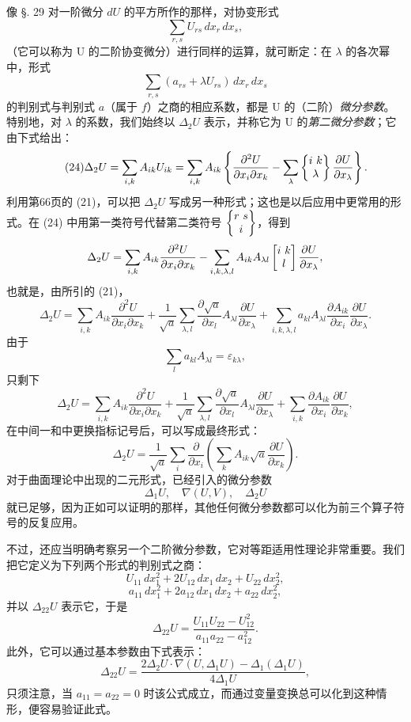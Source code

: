 像 §. 29 对一阶微分 \(dU\) 的平方所作的那样，对协变形式
\[
\sum_{r,s}U_{rs}\,dx_r\,dx_s,
\]
（它可以称为 U 的二阶协变微分）进行同样的运算，就可断定：在 \(\lambda\) 的各次幂中，形式
\[
\sum_{r,s}(a_{rs}+\lambda U_{rs})\,dx_r\,dx_s
\]
的判别式与判别式 \(a\)（属于 \(f\)）之商的相应系数，都是 U 的（二阶）\emph{微分参数}。特别地，对 \(\lambda\) 的系数，我们始终以 \(\Delta_2U\) 表示，并称它为 U 的\emph{第二微分参数}；它由下式给出：
\begin{equation}\tag{24}
\Delta_2U=\sum_{i,k}A_{ik}U_{ik}=\sum_{i,k}A_{ik}\left\{\frac{\partial^2U}{\partial x_i\partial x_k}-\sum_\lambda\left\{\begin{matrix}i\ k\\ \lambda\end{matrix}\right\}\frac{\partial U}{\partial x_\lambda}\right\}.
\end{equation}
利用第66页的 (21)，可以把 \(\Delta_2U\) 写成另一种形式；这也是以后应用中更常用的形式。在 (24) 中用第一类符号代替第二类符号 \(\left\{\begin{matrix}r\ s\\ i\end{matrix}\right\}\)，得到
\[
\Delta_2U=\sum_{i,k}A_{ik}\frac{\partial^2U}{\partial x_i\partial x_k}-\sum_{i,k,\lambda,l}A_{ik}A_{\lambda l}\left[\begin{matrix}i\ k\\ l\end{matrix}\right]\frac{\partial U}{\partial x_\lambda},
\]
也就是，由所引的 (21)，
\[
\Delta_2U=\sum_{i,k}A_{ik}\frac{\partial^2U}{\partial x_i\partial x_k}
+\frac{1}{\sqrt{a}}\sum_{\lambda,l}\frac{\partial\sqrt{a}}{\partial x_l}A_{\lambda l}\frac{\partial U}{\partial x_\lambda}
+\sum_{i,k,\lambda,l}a_{kl}A_{\lambda l}\frac{\partial A_{ik}}{\partial x_i}\frac{\partial U}{\partial x_\lambda}.
\]
由于
\[
\sum_l a_{kl}A_{\lambda l}=\varepsilon_{k\lambda},
\]
只剩下
\[
\Delta_2U=\sum_{i,k}A_{ik}\frac{\partial^2U}{\partial x_i\partial x_k}
+\frac{1}{\sqrt{a}}\sum_{\lambda,l}\frac{\partial\sqrt{a}}{\partial x_l}A_{\lambda l}\frac{\partial U}{\partial x_\lambda}
+\sum_{i,k}\frac{\partial A_{ik}}{\partial x_i}\frac{\partial U}{\partial x_k},
\]
在中间一和中更换指标记号后，可以写成最终形式：
\begin{equation}\tag{25}
\Delta_2U=\frac{1}{\sqrt{a}}\sum_i\frac{\partial}{\partial x_i}\left(\sum_k A_{ik}\sqrt{a}\frac{\partial U}{\partial x_k}\right).
\end{equation}
对于曲面理论中出现的二元形式，已经引入的微分参数
\[
\Delta_1U,\quad \nabla(U,V),\quad \Delta_2U
\]
就已足够，因为正如可以证明的那样，其他任何微分参数都可以化为前三个算子符号的反复应用。

不过，还应当明确考察另一个二阶微分参数，它对等距适用性理论非常重要。我们把它定义为下列两个形式的判别式之商：
\[
U_{11}\,dx_1^2+2U_{12}\,dx_1\,dx_2+U_{22}\,dx_2^2,
\]
\[
a_{11}\,dx_1^2+2a_{12}\,dx_1\,dx_2+a_{22}\,dx_2^2,
\]
并以 \(\Delta_{22}U\) 表示它，于是
\begin{equation}\tag{26}
\Delta_{22}U=\frac{U_{11}U_{22}-U_{12}^2}{a_{11}a_{22}-a_{12}^2}.
\end{equation}
此外，它可以通过基本参数由下式表示：
\begin{equation}\tag{26*}
\Delta_{22}U=\frac{2\Delta_2U\cdot\nabla(U,\Delta_1U)-\Delta_1(\Delta_1U)}{4\Delta_1U},
\end{equation}
只须注意，当 \(a_{11}=a_{22}=0\) 时该公式成立，而通过变量变换总可以化到这种情形，便容易验证此式。

